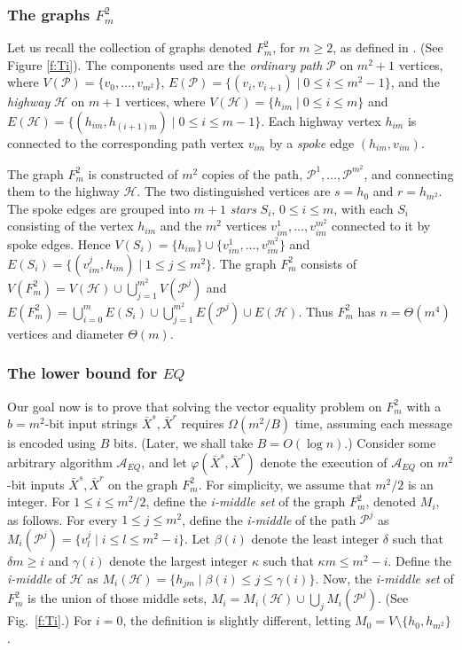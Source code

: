 \documentclass[11pt,letter]{article}
\def\cP{\mathcal{P}}
\def\cH{\mathcal{H}}
\def\cA{\mathcal{A}}
\def\INPUT{\bar{X}^s,\bar{X}^r}
\begin{document}
\subsubsection{The graphs $F^2_m$}
\label{ss:graphs}

Let us recall the collection of graphs denoted $F^2_m$, for
$m\ge 2$, as defined in \cite{PR_00}. (See Figure \ref{f:Ti}). The components used 
are the {\em ordinary path} $\cP$ on $m^2+1$ vertices, where
$V(\cP)= \{v_0,\dots,v_{m^2}\}$, 
$E(\cP) = \{(v_i, v_{i+1}) \mid 0 \le i \le m^2-1\}$,
and the {\em highway} $\cH$ on $m+1$ vertices, where
$V(\cH)= \{h_{im} \mid 0\le i\le m\}$ and
$E(\cH) = \{(h_{im},h_{(i+1)m}) \mid 0 \le i \le m-1\}$.
Each highway vertex $h_{im}$ is connected to the corresponding 
path vertex $v_{im}$ by a {\em spoke} edge $(h_{im},v_{im})$. 

The graph $F^2_m$ is constructed of $m^2$ copies of the path, 
$\cP^1,\dots,\cP^{m^2}$, and connecting them to the highway $\cH$.
The two distinguished vertices are $s=h_0$ and $r=h_{m^2}$.
The spoke edges are grouped into $m+1$ {\em stars} $S_i$, $0 \le i \le m$, 
with each $S_i$ consisting of the vertex $h_{im}$ and the $m^2$ vertices 
$v_{im}^1,\dots,v_{im}^{m^2}$ connected to it by spoke edges. Hence
$V(S_i) = \{h_{im}\} \cup \{v_{im}^1,\dots,v_{im}^{m^2}\}$
and $E(S_i) = \{(v^j_{im},h_{im}) \mid 1\le j \le m^2 \}$.
The graph $F^2_m$ consists of
$V(F^2_m) = V(\cH) \cup \bigcup_{j=1}^{m^2} V(\cP^j)$
and $E(F^2_m) = \bigcup_{i = 0}^{m} E(S_i) \cup
\bigcup_{j=1}^{m^2} E(\cP^j) \cup E(\cH)$.
Thus $F^2_m$ has $n = \Theta(m^4)$ vertices and diameter $\Theta(m)$.

\subsubsection{The lower bound for $EQ$}
\label{subsec:ITN}

Our goal now is to prove that solving the vector equality problem on $F_m^2$ with a $b=m^2$-bit input strings $\INPUT$ requires
$\Omega(m^2/B)$ time, assuming each message is encoded using $B$ bits. (Later, we shall take $B=O(\log n)$.)
\newline\indent
Consider some arbitrary algorithm $\cA_{EQ}$, and let $\varphi(\INPUT)$
denote the execution of $\cA_{EQ}$ on $m^2$-bit inputs $\INPUT$ on
the graph $F_m^2$. For simplicity, we assume that $m^2/2$ is an integer. For $1 \le i \le m^2/2$, 
define the {\em i-middle set}
of the graph $F_m^2$, denoted $M_i$, as follows. For every $1\le
j\le m^2$, define the {\em i-middle} of the path $\cP^j$ as
$M_i(\cP^j)=\{ v^j_l \mid i \le l \le m^2-i \}$.
Let $\beta(i)$ denote the least integer $\delta$ such that
$\delta m \ge i$ and $\gamma(i)$ denote the largest integer $\kappa$ such that 
$\kappa m \le m^2 -i$. Define the {\em i-middle} of $\cH$ as
$M_i(\cH)=\{ h_{jm} \mid \beta(i)\le j\le \gamma (i)\}$.
Now, the {\em i-middle set} of $F_m^2$ is the union of those middle sets,
$M_i = M_i(\cH) \cup \bigcup_j M_i(\cP^j).$
(See Fig.~\ref{f:Ti}.)
For $i=0$, the definition is slightly different, letting
$M_0=V\setminus \{h_0,h_{m^2}\}$.
\end{document}
